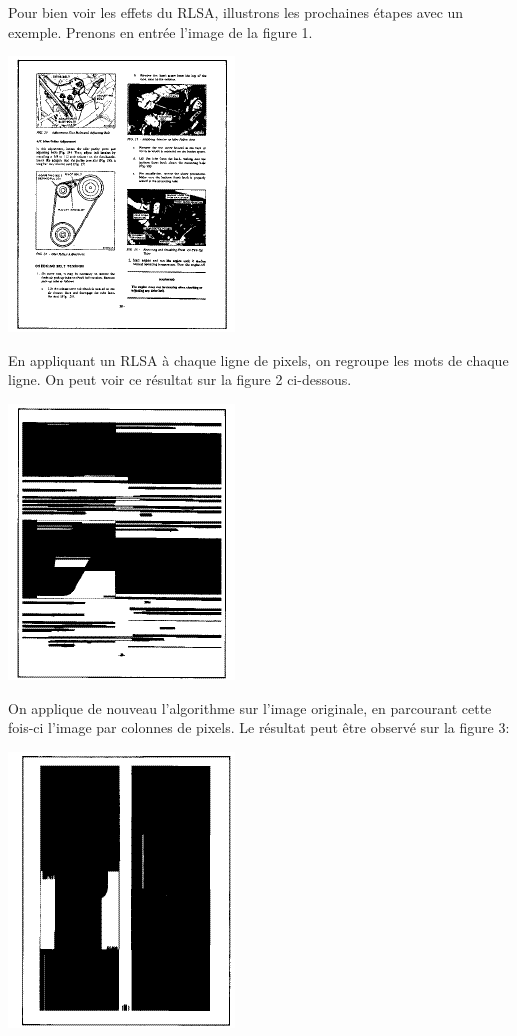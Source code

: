 \documentclass [french,12pt]{article}
\begin{document}
Pour bien voir les effets du RLSA, illustrons les prochaines étapes avec un exemple. Prenons en entrée l'image de la figure 1.

\begin{center} \includegraphics[scale=0.4]{rlsa_fig1} \end{center}

En appliquant un RLSA à chaque ligne de pixels, on regroupe les mots de chaque ligne. On peut voir ce résultat sur la figure 2 ci-dessous.

\begin{center} \includegraphics[scale=0.4]{rlsa_fig2} \end{center}

On applique de nouveau l'algorithme sur l'image originale, en parcourant cette fois-ci l'image par colonnes de pixels. Le résultat peut être observé sur la figure 3:

\begin{center} \includegraphics[scale=0.4]{rlsa_fig3} \end{center}
\end{document}
